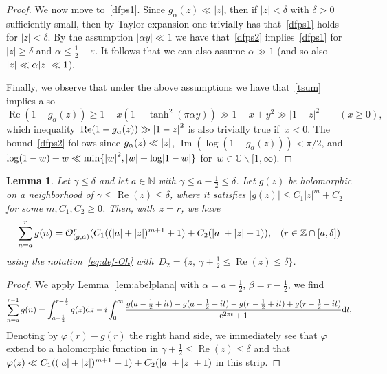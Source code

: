 \documentclass[11pt]{amsart}
\newcommand{\eps}{\varepsilon}
\newcommand{\C}{\mathbb{C}}
\newcommand{\N}{\mathbb{N}}
\newcommand{\Z}{\mathbb{Z}}
\newtheorem{lemma}{Lemma}
\theoremstyle{definition}
\newcommand{\pr}[1]{\mathchoice{\left( #1\right)}{(#1)}{(#1)}{(#1)}}
\newcommand{\e}[1][]{\ifthenelse{\equal{#1}{}}{{\rm e}}{\operatorname{e}\pr{ #1}}}
\newcommand{\df}{\mathrm{d}}
\newcommand{\Oh}{\mathcal{O}}
\renewcommand\Re{\operatorname{Re}}
\renewcommand\Im{\operatorname{Im}}
\newcommand\minus{\smallsetminus}
\newcommand{\1}{{\mathbf 1}}
\newcommand{\abs}[1]{\left|#1\right|}
\let\originalleft\left
\let\originalright\right
\renewcommand{\left}{\mathopen{}\mathclose\bgroup\originalleft}
\renewcommand{\right}{\aftergroup\egroup\originalright}
\numberwithin{equation}{section}
\begin{document}
\begin{proof}
  We now move to~\eqref{dfps1}. 
  Since $g_\alpha(z)\ll |z|$, then if $|z|<\delta$ with $\delta>0$ sufficiently small, then by Taylor expansion one trivially has that~\eqref{dfps1} holds for $|z|<\delta$. By the assumption $|\alpha y|\ll1$ we have that~\eqref{dfps2}
  implies~\eqref{dfps1} for $|z|\geq \delta$ and $\alpha \leq \frac12 - \eps$. It follows that we can also assume $\alpha\gg1$ (and so also $\abs{z}\ll \alpha \abs{z}\ll1$).
  
  Finally, we observe that under the above assumptions we have that~\eqref{tsum} implies also 
  $$\Re(1-g_\alpha(z)) \geq  1-x (1-\tanh^2(\pi\alpha y))\gg 1-x+ y^2\gg |1-z|^2 \qquad (x \geq 0), $$
  which inequality~$\Re(1-g_\alpha(z)) \gg \abs{1-z}^2$ is also trivially true if~$x<0$. The bound~\eqref{dfps2} follows since $g_\alpha(z)\ll \abs{z}$, $\Im(\log(1-g_\alpha(z))) < \pi / 2$, and $\log(1-w)+w \ll \min\{\abs{w}^2, \abs{w}+\log\abs{1-w}\}$ for~$w\in\C\minus[1, \infty)$.
\end{proof}




\begin{lemma}\label{triab}
  Let $\gamma\leq \delta$ and let $a\in\N$ with $\gamma\leq a-\frac12\leq \delta$.
  Let $g(z)$ be holomorphic on a neighborhood of $\gamma\leq \Re(z)\leq \delta$, where it satisfies $|g(z)|\leq C_1 |z|^m+C_2$ for some $m,C_1,C_2\geq0$.
  Then, with~$z=r$, we have
  \begin{align*}
    \sum_{n=a}^r g(n) = \Oh_{(g,a)}^r(C_1((\abs{a}+\abs{z})^{m+1}+1)+C_2(\abs{a}+\abs{z}+1)), && (r\in\Z\cap [a, \delta])
  \end{align*}
  using the notation~\eqref{eq:def-Oh} with~$D_2 = \{z,\ \gamma+\frac12 \leq \Re(z)\leq \delta\}$.
\end{lemma}
\begin{proof}
  We apply Lemma~\ref{lem:abelplana} with $\alpha=a-\frac12$, $\beta=r-\frac12$, we find
  \begin{align*}
    \sum_{n=a}^{r-1} g(n)=\int_{a-\frac12}^{r-\frac12}g(z)\df z- i \int_{0}^\infty  \frac{g(a-\frac12 + it)-g(a-\frac12 - it)-g(r-\frac12+ it)+g(r-\frac12 - it)}{\e^{2\pi t}+1}\df{t},
  \end{align*}
    Denoting by $\varphi(r)-g(r)$ the right hand side, we immediately see that $\varphi$ extend to a holomorphic function in $\gamma+\frac12 \leq \Re(z)\leq \delta$ and that $\varphi(z)\ll C_1((\abs{a}+\abs{z})^{m+1}+1)+C_2(\abs{a}+\abs{z}+1)$ in this strip.
\end{proof}
\end{document}
